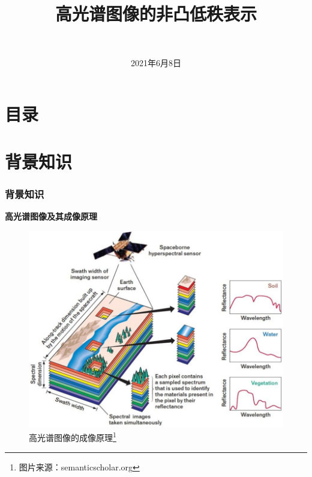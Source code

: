 \documentclass[10pt,aspectratio=43,mathserif]{beamer}
\title[高光谱图像的非凸低秩表示]{
	\fontsize{14pt}{25pt}\selectfont \textbf{高光谱图像的非凸低秩表示}
}
\subtitle{\fontsize{13pt}{14pt}\selectfont {在图像降噪方面的使用}}
\institute[SEU]{
	\fontsize{10pt}{11pt}\selectfont {东南大学{\quad}吴健雄学院}
}
\author[陈安皓]{
	\fontsize{13pt}{14pt}\selectfont {学生姓名：陈安皓}\\
	\fontsize{13pt}{14pt}\selectfont {指导教师：贾育衡}
}
\date[2021年6月8日]{
 2021年6月8日
}
\begin{document}
\begin{frame}
\titlepage
\end{frame}

\section*{目录}


\section[背景知识]{背景知识}

\begin{frame}
\frametitle{\textbf{背景知识}}
\begin{block}{\textbf{高光谱图像及其成像原理}}
\begin{figure}[H]
\centering
\includegraphics[scale=0.22]{img-principleofphotograph.png}
\caption{高光谱图像的成像原理\footnote{图片来源：semanticscholar.org}}
\end{figure}
\end{block}
\end{frame}
    
\end{document}
